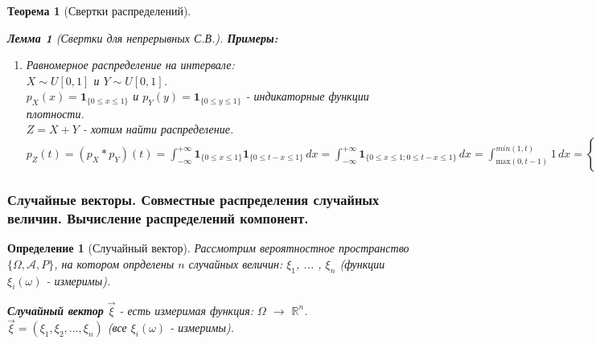 \documentclass[14pt]{extarticle}
\theoremstyle{breakstyle}
\newtheorem{definition}{Определение}[subsection]
\newtheorem{theorem}{Теорема}[subsection]
\newtheorem{lemma}{Лемма}[subsection]
\begin{document}
\begin{theorem}[Свертки распределений]
\begin{lemma}[Свертки для непрерывных С.В.]
\vspace{\baselineskip}

\textbf{Примеры:}
\begin{enumerate}
    \item Равномерное распределение на интервале: \\
          $X \sim U[0, 1]$ и $Y \sim U[0, 1]$.\\
          $p_{X}(x) = \mathbf{1}_{\{0 \leq x \leq 1\}}$ и $p_{Y}(y) = \mathbf{1}_{\{0 \leq y \leq 1\}}$ - индикаторные функции плотности.\\
          $Z = X+Y$ - хотим найти распределение.\\
          $p_{Z}(t) = (p_{X} * p_{Y})(t) = \int_{-\infty}^{+\infty} \mathbf{1}_{\{0 \leq x \leq 1\}} \mathbf{1}_{\{0 \leq t - x \leq 1\}} \, dx = \int_{-\infty}^{+\infty}\mathbf{1}_{\{0 \leq x \leq 1; 0 \leq t - x \leq 1\}} \, dx = \int_{\text{max}(0, t-1)}^{min(1, t)} 1 \, dx = \begin{cases} 
          t, & t \in [0, 1] \\
          1 - (t - 1), & t \in [1, 2]
          \end{cases}$ 
\end{enumerate}

\end{lemma}

\end{theorem}

\subsubsection{Случайные векторы. Совместные распределения случайных величин. Вычисление распределений компонент.}
\begin{definition}[Случайный вектор]

Рассмотрим вероятностное пространство $\{\Omega, \mathscr{A}, P\}$, на котором опрделены $n$ случайных величин: $\xi_{1}$, ... , $\xi_{n}$ (функции $\xi_{i}(\omega)$ - измеримы).

\vspace{\baselineskip}

\textbf{Случайный вектор} $\vec{\xi}$ - есть измеримая функция: $\Omega$ $\rightarrow$ $\mathbb{R}^{n}$. \\
$\vec{\xi} = (\xi_{1}, \xi_{2}, ... , \xi_{n})$ (все $\xi_{i}(\omega)$ - измеримы).

\end{definition}
\end{document}
